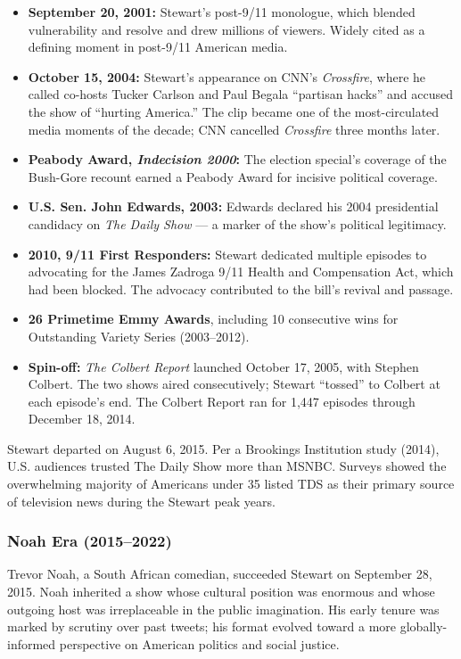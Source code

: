\documentclass[11pt,letterpaper]{article}
\begin{document}
\begin{itemize}[leftmargin=*]
  \item \textbf{September 20, 2001:} Stewart's post-9/11 monologue, which blended vulnerability and resolve and drew millions of viewers. Widely cited as a defining moment in post-9/11 American media.
  \item \textbf{October 15, 2004:} Stewart's appearance on CNN's \textit{Crossfire}, where he called co-hosts Tucker Carlson and Paul Begala ``partisan hacks'' and accused the show of ``hurting America.'' The clip became one of the most-circulated media moments of the decade; CNN cancelled \textit{Crossfire} three months later.
  \item \textbf{Peabody Award, \textit{Indecision 2000}:} The election special's coverage of the Bush-Gore recount earned a Peabody Award for incisive political coverage.
  \item \textbf{U.S. Sen. John Edwards, 2003:} Edwards declared his 2004 presidential candidacy on \textit{The Daily Show} --- a marker of the show's political legitimacy.
  \item \textbf{2010, 9/11 First Responders:} Stewart dedicated multiple episodes to advocating for the James Zadroga 9/11 Health and Compensation Act, which had been blocked. The advocacy contributed to the bill's revival and passage.
  \item \textbf{26 Primetime Emmy Awards}, including 10 consecutive wins for Outstanding Variety Series (2003--2012).
  \item \textbf{Spin-off:} \textit{The Colbert Report} launched October 17, 2005, with Stephen Colbert. The two shows aired consecutively; Stewart ``tossed'' to Colbert at each episode's end. The Colbert Report ran for 1,447 episodes through December 18, 2014.
\end{itemize}

Stewart departed on August 6, 2015. Per a Brookings Institution study (2014), U.S. audiences trusted The Daily Show more than MSNBC. Surveys showed the overwhelming majority of Americans under 35 listed TDS as their primary source of television news during the Stewart peak years.

\subsubsection{Noah Era (2015--2022)}

Trevor Noah, a South African comedian, succeeded Stewart on September 28, 2015. Noah inherited a show whose cultural position was enormous and whose outgoing host was irreplaceable in the public imagination. His early tenure was marked by scrutiny over past tweets; his format evolved toward a more globally-informed perspective on American politics and social justice.
\end{document}
